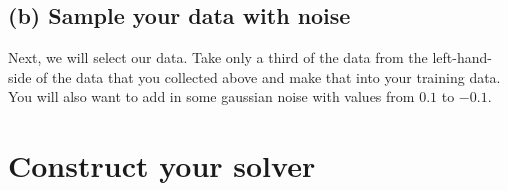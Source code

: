 \documentclass{article}
\begin{document}
\subsection{(b) Sample your data with noise}

Next, we will select our data. Take only a third of the data from the left-hand-side of the data that you collected above and make that into your training data. You will also want to add in some gaussian noise with values from $0.1$ to $-0.1$.

\section{Construct your solver}






\end{document}
